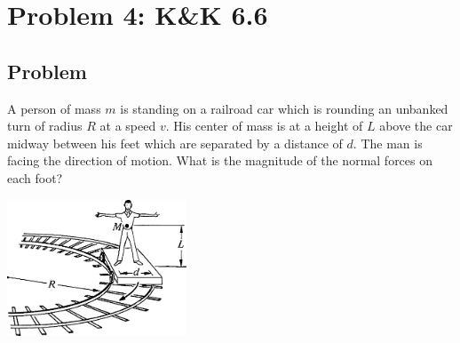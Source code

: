 \documentclass[solutions]{esg8012pset}
\begin{document}
\section*{Problem 4: K\&K 6.6}
\subsection*{Problem}
  A person of mass $m$ is standing on a railroad car which is rounding an unbanked turn of radius $R$ at a speed $v$. His center of mass is at a height of $L$ above the car midway between his feet which are separated by a distance of $d$. The man is facing the direction of motion. What is the magnitude of the normal forces on each foot?
  \begin{center}\includegraphics[width=0.4\textwidth]{ps08_3}\end{center}
\end{document}

